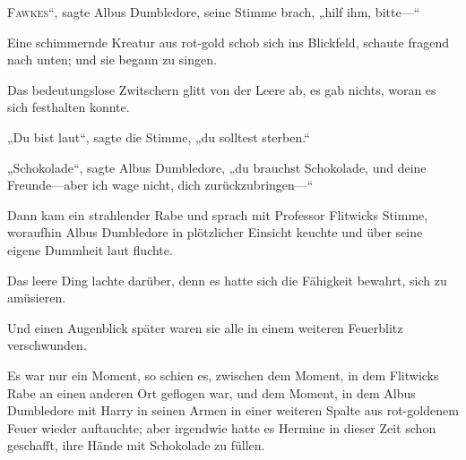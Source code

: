
\lettrine[ante=„]{F}{awkes}“, sagte Albus Dumbledore, seine Stimme brach, „hilf ihm, bitte—“

Eine schimmernde Kreatur aus rot-gold schob sich ins Blickfeld, schaute fragend nach unten; und sie begann zu singen.

Das bedeutungslose Zwitschern glitt von der Leere ab, es gab nichts, woran es sich festhalten konnte.

„Du bist laut“, sagte die Stimme, „du solltest sterben.“

„Schokolade“, sagte Albus Dumbledore, „du brauchst Schokolade, und deine Freunde—aber ich wage nicht, dich zurückzubringen—“

Dann kam ein strahlender Rabe und sprach mit Professor Flitwicks Stimme, woraufhin Albus Dumbledore in plötzlicher Einsicht keuchte und über seine eigene Dummheit laut fluchte.

Das leere Ding lachte darüber, denn es hatte sich die Fähigkeit bewahrt, sich zu amüsieren.

Und einen Augenblick später waren sie alle in einem weiteren Feuerblitz verschwunden.

\later

Es war nur ein Moment, so schien es, zwischen dem Moment, in dem Flitwicks Rabe an einen anderen Ort geflogen war, und dem Moment, in dem Albus Dumbledore mit Harry in seinen Armen in einer weiteren Spalte aus rot-goldenem Feuer wieder auftauchte; aber irgendwie hatte es Hermine in dieser Zeit schon geschafft, ihre Hände mit Schokolade zu füllen.

